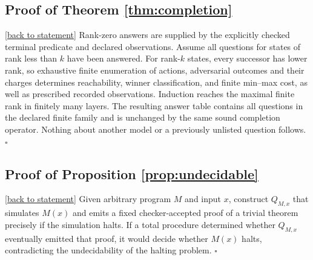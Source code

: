 \documentclass[11pt,letterpaper]{article}
\theoremstyle{definition}
\theoremstyle{remark}
\newcommand{\backlink}[1]{\hyperlink{claim:#1}{\footnotesize[back to statement]}}
\begin{document}
\hypertarget{proof:completion}{}\subsection*{Proof of Theorem \ref{thm:completion}}\backlink{completion}
Rank-zero answers are supplied by the explicitly checked terminal predicate and declared observations. Assume all questions for states of rank less than $k$ have been answered. For rank-$k$ states, every successor has lower rank, so exhaustive finite enumeration of actions, adversarial outcomes and their charges determines reachability, winner classification, and finite min--max cost, as well as prescribed recorded observations. Induction reaches the maximal finite rank in finitely many layers. The resulting answer table contains all questions in the declared finite family and is unchanged by the same sound completion operator. Nothing about another model or a previously unlisted question follows. $\square$

\hypertarget{proof:undecidable}{}\subsection*{Proof of Proposition \ref{prop:undecidable}}\backlink{undecidable}
Given arbitrary program $M$ and input $x$, construct $Q_{M,x}$ that simulates $M(x)$ and emits a fixed checker-accepted proof of a trivial theorem precisely if the simulation halts. If a total procedure determined whether $Q_{M,x}$ eventually emitted that proof, it would decide whether $M(x)$ halts, contradicting the undecidability of the halting problem. $\square$
\end{document}
